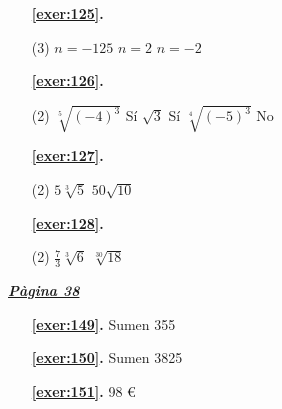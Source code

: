 \begin{enumerate}

 \item[\fontfamily{phv}\selectfont\color{blue}\textbf{\ref{exer:125}. }] \label{ans:125}
 \begin{tasks}[column-sep=1em, item-indent=1.3333em](3)
	 \task $n=-125$
	 \task $n=2$
	 \task $n=-2$
\end{tasks}



 \item[\fontfamily{phv}\selectfont\color{blue}\textbf{\ref{exer:126}. }] \label{ans:126}
 \begin{tasks}[column-sep=1em, item-indent=1.3333em](2)
	 \task* $\sqrt [{5}]{\left (-4\right )^{3}}$ Sí
	 \task $\sqrt {3}$ Sí
	 \task* $\sqrt [{4}]{\left (-5\right )^{3} }$ No
\end{tasks}



 \item[\fontfamily{phv}\selectfont\color{blue}\textbf{\ref{exer:127}. }] \label{ans:127}
 \begin{tasks}[column-sep=1em, item-indent=1.3333em](2)
	 \task $5\sqrt [3]{5}$
	 \task $50\sqrt {10}$
\end{tasks}



 \item[\fontfamily{phv}\selectfont\color{blue}\textbf{\ref{exer:128}. }] \label{ans:128}
 \begin{tasks}[column-sep=1em, item-indent=1.3333em](2)
	 \task $\frac {7}{3}\sqrt [3]{6}$
	 \task $\sqrt [30]{18}$
\end{tasks}
 \end{enumerate}

 \vspace{1cm} 
 

\vspace{0.3cm}


\hyperlink{page.38}{\textbf{\em Pàgina 38}}
\begin{enumerate}
\item[\fontfamily{phv}\selectfont\color{blue}\textbf{\ref{exer:149}. }] \label{ans:149} 
Sumen 355
 \end{enumerate}
\begin{enumerate}
\item[\fontfamily{phv}\selectfont\color{blue}\textbf{\ref{exer:150}. }] \label{ans:150} 
Sumen 3825
\item[\fontfamily{phv}\selectfont\color{blue}\textbf{\ref{exer:151}. }] \label{ans:151} 
98 \euro {}
 \end{enumerate}
\vspace{0.3cm}

